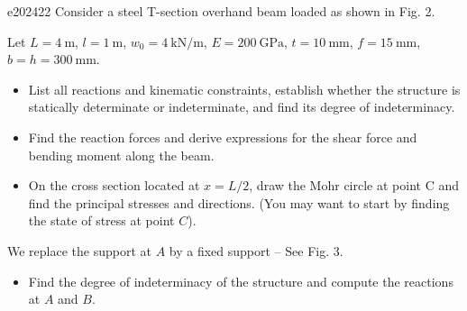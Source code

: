 \begin{problemwithimage}{e20242}{2}
  Consider a steel T-section overhand beam loaded as shown in Fig. 2.

  Let $L = \qty{4}{\m}$, $l = \qty{1}{\m}$, $w_0 = \qty{4}{\kN\per\m}$, $E= \qty{200}{\GPa} $, $t = \qty{10}{\mm}$, $f = \qty{15}{\mm}$, $b = h = \qty{300}{\mm}$.

  \begin{itemize}
    \item[Q2.1] List all reactions and kinematic constraints, establish whether the structure is statically determinate or indeterminate, and find its degree of indeterminacy.
    \item[Q2.2] Find the reaction forces and derive expressions for the shear force and bending moment along the beam.
    \item[Q2.3] On the cross section located at $x = L / 2$, draw the Mohr circle at point C and find the principal stresses and directions. (You may want to start by finding the state of stress at point $C$).
  \end{itemize}

  We replace the support at $A$ by a fixed support -- See Fig. 3.

  \begin{itemize}
    \item[Q2.4] Find the degree of indeterminacy of the structure and compute the reactions at $A$ and $B$.
  \end{itemize}
\end{problemwithimage}

